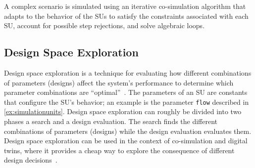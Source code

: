 A complex scenario is simulated using an iterative co-simulation algorithm that adapts to the behavior of the SUs to satisfy the constraints associated with each SU, account for possible step rejections, and solve algebraic loops. 



\subsection{Design Space Exploration}
Design space exploration is a technique for evaluating how different combinations of parameters (designs) affect the system's performance to determine which parameter combinations are ``optimal''~\cite{kang_approach_2011}.
The parameters of an SU are constants that configure the SU's behavior; an example is the parameter \texttt{flow} described in \cref{ex:simulationunits}.
Design space exploration can roughly be divided into two phases a search and a design evaluation.
The search finds the different combinations of parameters (designs) while the design evaluation evaluates them.
Design space exploration can be used in the context of co-simulation and digital twins, where it provides a cheap way to explore the consequence of different design decisions~\cite{gamble_design_2014,dse}.


